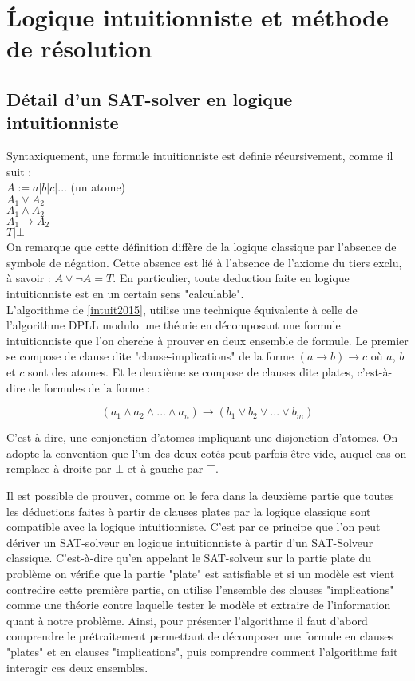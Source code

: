 \section{\'Logique intuitionniste et m\'ethode de r\'esolution}

\subsection{D\'etail d'un SAT-solver en logique intuitionniste}
Syntaxiquement, une formule intuitionniste est definie récursivement, comme il suit : \\

$A := a | b |c |... $ (un atome) \\
$A_1 \lor A_2 $ \\
$A_1 \land A_2 $ \\
$A_1 \to A_2 $ \\
$T | \bot$ \\


On remarque que cette d\'efinition diff\`ere de la logique classique par l'absence de symbole de n\'egation. Cette absence est li\'e \`a l'absence de l'axiome du tiers exclu, \`a savoir : $A \lor \neg A = T$. En particulier, toute deduction faite en logique intuitionniste est en un certain sens "calculable".
\\
L'algorithme de \ref{intuit2015}, utilise une technique \'equivalente à celle de l'algorithme DPLL modulo une théorie en d\'ecomposant une formule intuitionniste que l'on cherche \`a prouver en deux ensemble de formule. Le premier se compose de clause dite "clause-implications" de la forme $(a \to b) \to c$ o\`u $a$, $b$et $c$ sont des atomes. Et le deuxi\`eme se compose de clauses dite plates, c'est-\`a-dire de formules de la forme :

$$(a_1 \land a_2 \land ... \land a_n) \to (b_1 \lor b_2 \lor ... \lor b_m) $$

C'est-\`a-dire, une conjonction d'atomes impliquant une disjonction d'atomes. On adopte la convention que l'un des deux cot\'es peut parfois \^etre vide, auquel cas on remplace \`a droite par $\bot$ et \`a gauche par $\top$. 


Il est possible de prouver, comme on le fera dans la deuxi\`eme partie que toutes les déductions faites \`a partir de clauses plates par la logique classique sont compatible avec la logique intuitionniste. C'est par ce principe que l'on peut d\'eriver un SAT-solveur en logique intuitionniste \`a partir d'un SAT-Solveur classique. C'est-\`a-dire qu'en appelant le SAT-solveur sur la partie plate du probl\`eme on v\'erifie que la partie "plate" est satisfiable et si un mod\`ele est vient contredire cette premi\`ere partie, on utilise l'ensemble des clauses "implications" comme une th\'eorie contre laquelle tester le mod\`ele et extraire de l'information quant \`a notre probl\`eme.
Ainsi, pour pr\'esenter l'algorithme il faut d'abord comprendre le pr\'etraitement permettant de d\'ecomposer une formule en clauses "plates" et en clauses "implications", puis comprendre comment l'algorithme fait interagir ces deux ensembles.



